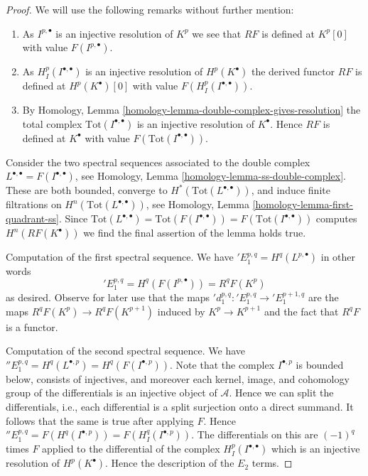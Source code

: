 \begin{proof}
We will use the following remarks without further mention:
\begin{enumerate}
\item As $I^{p, \bullet}$ is an injective resolution of
$K^p$ we see that $RF$ is defined at $K^p[0]$
with value $F(I^{p, \bullet})$.
\item As $H^p_I(I^{\bullet, \bullet})$ is an injective resolution of
$H^p(K^\bullet)$ the derived functor $RF$ is defined at $H^p(K^\bullet)[0]$
with value $F(H^p_I(I^{\bullet, \bullet}))$.
\item By
Homology, Lemma \ref{homology-lemma-double-complex-gives-resolution}
the total complex $\text{Tot}(I^{\bullet, \bullet})$
is an injective resolution of
$K^\bullet$. Hence $RF$ is defined at $K^\bullet$ with value
$F(\text{Tot}(I^{\bullet, \bullet}))$.
\end{enumerate}
Consider the two spectral sequences associated to the double complex
$L^{\bullet, \bullet} = F(I^{\bullet, \bullet})$, see
Homology, Lemma \ref{homology-lemma-ss-double-complex}.
These are both bounded, converge to $H^*(\text{Tot}(L^{\bullet, \bullet}))$,
and induce finite filtrations on $H^n(\text{Tot}(L^{\bullet, \bullet}))$, see
Homology, Lemma \ref{homology-lemma-first-quadrant-ss}.
Since
$\text{Tot}(L^{\bullet, \bullet}) =
\text{Tot}(F(I^{\bullet, \bullet})) =
F(\text{Tot}(I^{\bullet, \bullet}))$ computes
$H^n(RF(K^\bullet))$ we find the final assertion of the lemma holds true.

\medskip\noindent
Computation of the first spectral sequence. We have
${}'E_1^{p, q} = H^q(L^{p, \bullet})$ in other words
$$
{}'E_1^{p, q} = H^q(F(I^{p, \bullet})) = R^qF(K^p)
$$
as desired. Observe for later use that the maps
${}'d_1^{p, q} : {}'E_1^{p, q} \to {}'E_1^{p + 1, q}$ are the maps
$R^qF(K^p) \to R^qF(K^{p + 1})$ induced by $K^p \to K^{p + 1}$
and the fact that $R^qF$ is a functor.

\medskip\noindent
Computation of the second spectral sequence. We have
${}''E_1^{p, q} = H^q(L^{\bullet, p}) = H^q(F(I^{\bullet, p}))$.
Note that the complex $I^{\bullet, p}$ is bounded below,
consists of injectives, and moreover each kernel, image, and
cohomology group of the differentials is an injective object
of $\mathcal{A}$. Hence we can split the differentials, i.e.,
each differential is a split surjection onto a direct summand.
It follows that the same is true after applying $F$. Hence
${}''E_1^{p, q} = F(H^q(I^{\bullet, p})) = F(H^q_I(I^{\bullet, p}))$.
The differentials on this are $(-1)^q$ times $F$ applied to
the differential of the complex $H^p_I(I^{\bullet, \bullet})$
which is an injective resolution of $H^p(K^\bullet)$. Hence the
description of the $E_2$ terms.
\end{proof}

